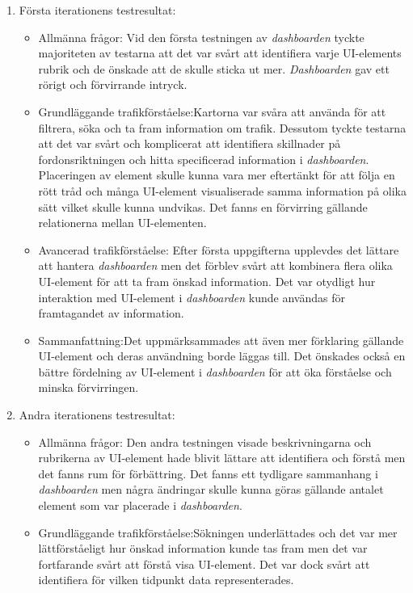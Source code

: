 \documentclass[12pt]{kththesis}
\begin{document}
\begin{enumerate}
\item Första iterationens testresultat:
\begin{itemize}
\item Allmänna frågor: Vid den första testningen av \textit{dashboarden} tyckte majoriteten av testarna att det var svårt att identifiera varje UI-elements rubrik och de önskade att de skulle sticka ut mer. \textit{Dashboarden} gav ett rörigt och förvirrande intryck. 

\item Grundläggande trafikförståelse:Kartorna var svåra att använda för att filtrera, söka och ta fram information om trafik. Dessutom tyckte testarna att det var svårt och komplicerat att identifiera skillnader på fordonsriktningen och hitta specificerad information i \textit{dashboarden}. Placeringen av element skulle kunna vara mer eftertänkt för att följa en rött tråd och många UI-element visualiserade samma information på olika sätt vilket skulle kunna undvikas. Det fanns en förvirring gällande relationerna mellan UI-elementen. 

\item Avancerad trafikförståelse: Efter första uppgifterna upplevdes det lättare att hantera \textit{dashboarden} men det förblev svårt att kombinera flera olika UI-element för att ta fram önskad information. Det var otydligt hur interaktion med UI-element i \textit{dashboarden} kunde användas för framtagandet av information. 

\item Sammanfattning:Det uppmärksammades att även mer förklaring gällande UI-element och deras användning borde läggas till. Det önskades också en bättre fördelning av UI-element i \textit{dashboarden} för att öka förståelse och minska förvirringen.
\end{itemize}

\item    Andra iterationens testresultat:

\begin{itemize}
\item Allmänna frågor: Den andra testningen visade beskrivningarna och rubrikerna av UI-element hade blivit lättare att identifiera och förstå men det fanns rum för förbättring. Det fanns ett tydligare sammanhang i \textit{dashboarden} men några ändringar skulle kunna göras gällande antalet element som var placerade i \textit{dashboarden}.

\item Grundläggande trafikförståelse:Sökningen underlättades och det var mer lättförståeligt hur önskad information kunde tas fram men det var fortfarande svårt att förstå visa UI-element. Det var dock svårt att identifiera för vilken tidpunkt data representerades.


\end{itemize}
\end{enumerate}
\end{document}

